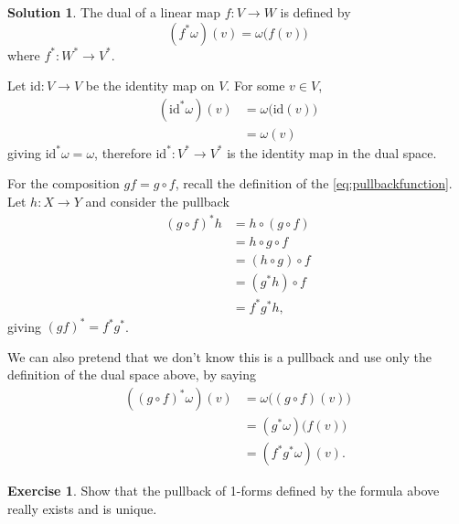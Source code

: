\documentclass[11pt, a4paper]{report}
\theoremstyle{definition}
\newtheorem{ex}{Exercise}[part]
\newtheorem{sol}{Solution}[part]
\begin{document}
\begin{sol}

The dual of a linear map $f: V \to W$ is defined by
\[
    (f^*\omega)(v) = \omega \bigl( f(v) \bigr)
\]
where $f^*: W^* \to V^*$.

Let $\text{id}: V \to V$ be the identity map on $V$. For some $v \in V$,
\begin{align*}
    (\text{id}^*\omega)(v) &= \omega \bigl( \text{id}(v) \bigr) \\
                           &= \omega(v)
\end{align*}
giving $\text{id}^*\omega = \omega$, therefore $\text{id}^*: V^* \to V^*$ is the identity map in the dual space.

For the composition $gf = g \circ f$, recall the definition of the \ref{eq:pullbackfunction}. %
Let $h: X \to Y$ and consider the pullback
\begin{align*}
    {(g \circ f)}^* h &= h \circ (g \circ f) \\
                      &= h \circ g \circ f \\
                      &= (h \circ g) \circ f \\
                      &= (g^* h) \circ f \\
                      &= f^* g^* h,
\end{align*}
giving ${(gf)}^* = f^* g^*$.

We can also pretend that we don't know this is a pullback and use only the definition of the dual space above, by saying
\begin{align*}
    ({(g \circ f)}^*\omega)(v) &= \omega \bigl( (g \circ f)(v) \bigr) \\
        &= (g^* \omega) \bigl( f(v) \bigr) \\
        &= (f^* g^* \omega)(v).
\end{align*}

\end{sol}

\begin{ex}

Show that the pullback of 1-forms defined by the formula above really exists and is unique.

\end{ex}
\end{document}
